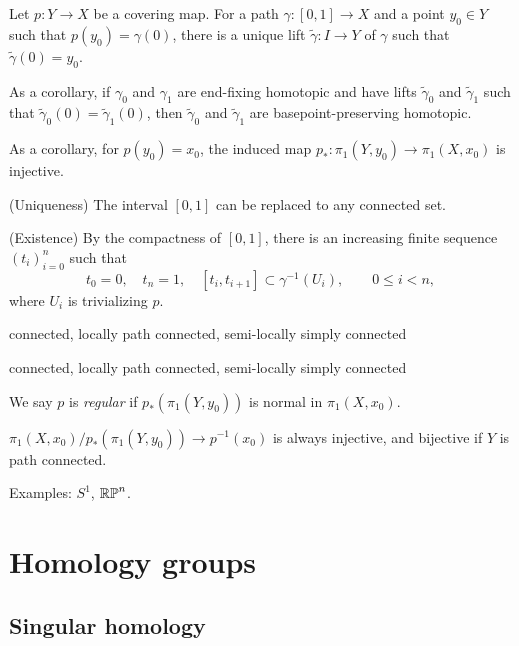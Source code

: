 \documentclass{../../large}
\begin{document}
\begin{prb}
Let $p:Y\to X$ be a covering map.
For a path $\gamma:[0,1]\to X$ and a point $y_0\in Y$ such that $p(y_0)=\gamma(0)$, there is a unique lift $\tilde\gamma:I\to Y$ of $\gamma$ such that $\tilde\gamma(0)=y_0$.

As a corollary, if $\gamma_0$ and $\gamma_1$ are end-fixing homotopic and have lifts $\tilde\gamma_0$ and $\tilde\gamma_1$ such that $\tilde\gamma_0(0)=\tilde\gamma_1(0)$, then $\tilde\gamma_0$ and $\tilde\gamma_1$ are basepoint-preserving homotopic.

As a corollary, for $p(y_0)=x_0$, the induced map $p_*:\pi_1(Y,y_0)\to\pi_1(X,x_0)$ is injective.
\end{prb}
\begin{pf}

(Uniqueness)
The interval $[0,1]$ can be replaced to any connected set.

(Existence)
By the compactness of $[0,1]$, there is an increasing finite sequence $(t_i)_{i=0}^n$ such that
\[t_0=0,\quad t_n=1,\quad[t_i,t_{i+1}]\subset\gamma^{-1}(U_i),\qquad 0\le i<n,\]
where $U_i$ is trivializing $p$.


\end{pf}

\begin{prb}
connected, locally path connected, semi-locally simply connected

\end{prb}

\begin{prb}
connected, locally path connected, semi-locally simply connected

We say $p$ is \emph{regular} if $p_*(\pi_1(Y,y_0))$ is normal in $\pi_1(X,x_0)$.

$\pi_1(X,x_0)/p_*(\pi_1(Y,y_0))\to p^{-1}(x_0)$ is always injective, and bijective if $Y$ is path connected.
\end{prb}


Examples: $S^1$, $\mathbb{RP}^n$.



\chapter{Homology groups}
\section{Singular homology}
\end{document}
